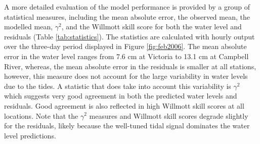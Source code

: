 \documentclass{tATO2e}
\begin{document}
A more detailed evaluation of the model performance is provided by a group of statistical measures, including the mean absolute error, the observed mean, the modelled mean, $\gamma^2$, and the Willmott skill score for both the water level and residuals (Table \ref{tab:statistics}). The statistics are calculated with hourly output over the three-day period displayed in Figure \ref{fig:feb2006}. The mean absolute error in the water level ranges from 7.6 cm at Victoria to 13.1 cm at Campbell River, whereas, the mean absolute error in the residuals is smaller at all stations, however, this measure does not account for the large variability in water levels due to the tides. A statistic that does take into account this variability is $\gamma^2$ which suggests very good agreement in both the predicted water levels and residuals. Good agreement is also reflected in high Willmott skill scores at all locations. Note that the $\gamma^2$ measures and Willmott skill scores degrade slightly for the residuals, likely because the well-tuned tidal signal dominates the water level predictions.
\end{document}
